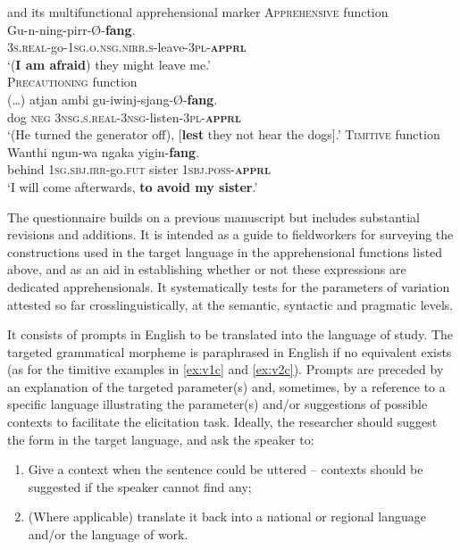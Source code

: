 \documentclass[output=paper,colorlinks,citecolor=brown]{langscibook}
\begin{document}
\ea \label{ex:v2} \textnormal{ and its multifunctional apprehensional marker \citep[80, 166, 58, MV's emphasis]{green1989}}
\ea \label{ex:v2a} \textnormal{\textsc{Apprehensive} function} \\
\gll Gu-n-ning-pirr-Ø-\textbf{fang}. \\
\textsc{3s.real}-go-\textsc{1sg.o.nsg.nirr.s}-leave-\textsc{3pl-\textbf{apprl}} \\
\glt `({\textbf{I am afraid}}) they might leave me.' \\
\ex \label{ex:v2b} \textnormal{\textsc{Precautioning} function }\\
\gll \textnormal{(\ldots)} {\ob}atjan ambi gu-iwinj-sjang-Ø-\textbf{fang}{\cb}.\\
{} dog \textsc{neg} \textsc{3nsg.s.real-3nsg-}listen-\textsc{3pl-\textbf{apprl}} \\
\glt `(He turned the generator off), [\textbf{lest} they not hear the dogs].'
\ex \label{ex:v2c} \textnormal{\textsc{Timitive} function }\\
\gll Wanthi ngun-wa ngaka yigin-\textbf{fang}. \\
behind \textsc{1sg.sbj.irr}-go\textsc{.fut} sister \textsc{1sbj.poss-\textbf{apprl}} \\
\glt `I will come afterwards, \textbf{to avoid my sister}.'
\z
\z

The questionnaire builds on a previous manuscript \citep{VuillermetM2018questionnaire} but includes substantial revisions and additions.  It is intended as a guide to fieldworkers for surveying the constructions used in the target language in the apprehensional functions listed above, and as an aid in establishing whether or not these expressions are dedicated apprehensionals. It  systematically tests for the parameters of variation attested so far crosslinguistically, at the semantic, syntactic and pragmatic levels.

It consists of prompts in English to be translated into the language of study. The targeted grammatical morpheme is paraphrased in English if no equivalent exists (as for the timitive examples in \ref{ex:v1c} and \ref{ex:v2c}). Prompts are preceded by an explanation of the targeted parameter(s) and, sometimes, by a reference to a specific language illustrating the parameter(s) and/or suggestions of possible contexts to facilitate the elicitation task. Ideally, the researcher should suggest the form in the target language, and ask the speaker to:

\begin{enumerate}
    \item Give a context when the sentence could be uttered -- contexts should be suggested if the speaker cannot find any;
    \item (Where applicable) translate it back into a national or regional language and/or the language of work.
    
\end{enumerate}
\end{document}
